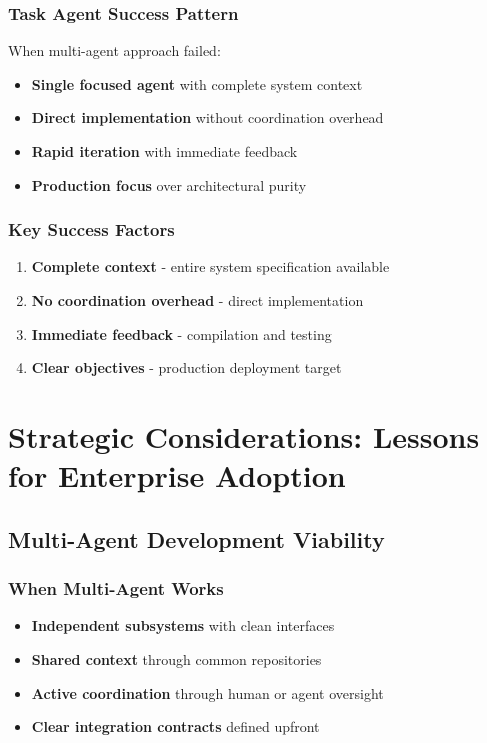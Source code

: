 \documentclass[11pt]{article}
\begin{document}
\subsubsection{Task Agent Success Pattern}
\label{sec:org5700b9b}
When multi-agent approach failed:
\begin{itemize}
\item \textbf{\textbf{Single focused agent}} with complete system context
\item \textbf{\textbf{Direct implementation}} without coordination overhead
\item \textbf{\textbf{Rapid iteration}} with immediate feedback
\item \textbf{\textbf{Production focus}} over architectural purity
\end{itemize}
\subsubsection{Key Success Factors}
\label{sec:orgf2107ab}
\begin{enumerate}
\item \textbf{\textbf{Complete context}} - entire system specification available
\item \textbf{\textbf{No coordination overhead}} - direct implementation
\item \textbf{\textbf{Immediate feedback}} - compilation and testing
\item \textbf{\textbf{Clear objectives}} - production deployment target
\end{enumerate}
\section{Strategic Considerations: Lessons for Enterprise Adoption}
\label{sec:orgf356c98}

\subsection{Multi-Agent Development Viability}
\label{sec:org6ae1e0f}
\subsubsection{When Multi-Agent Works}
\label{sec:orga5a3726}
\begin{itemize}
\item \textbf{\textbf{Independent subsystems}} with clean interfaces
\item \textbf{\textbf{Shared context}} through common repositories
\item \textbf{\textbf{Active coordination}} through human or agent oversight
\item \textbf{\textbf{Clear integration contracts}} defined upfront
\end{itemize}
\end{document}

